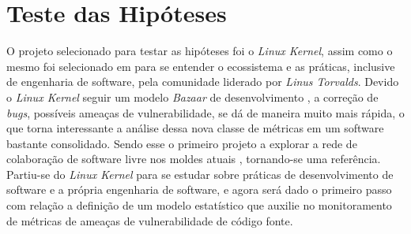 \section{Teste das Hipóteses}\label{metodologia:testehipoteses}

O projeto selecionado para testar as hipóteses foi o \textit{Linux Kernel},
assim como o mesmo foi selecionado em  para se
entender o ecossistema e as práticas, inclusive de engenharia de software, pela
comunidade liderado por \textit{Linus Torvalds}. Devido o \textit{Linux Kernel}
seguir um modelo \textit{Bazaar} de desenvolvimento
\cite{cathedral_bazaar:1997}, a correção de \textit{bugs}, possíveis ameaças de
vulnerabilidade, se dá de maneira muito mais rápida, o que torna interessante a
análise dessa nova classe de métricas em um software bastante consolidado. Sendo
esse o primeiro projeto a explorar a rede de colaboração de software livre nos
moldes atuais \cite{cathedral_bazaar:1997}, tornando-se uma referência.
Partiu-se do \textit{Linux Kernel} para se estudar sobre práticas de
desenvolvimento de software e a própria engenharia de software, e agora será
dado o primeiro passo com relação a definição de um modelo estatístico que
auxilie no monitoramento de métricas de ameaças de vulnerabilidade de código
fonte.

